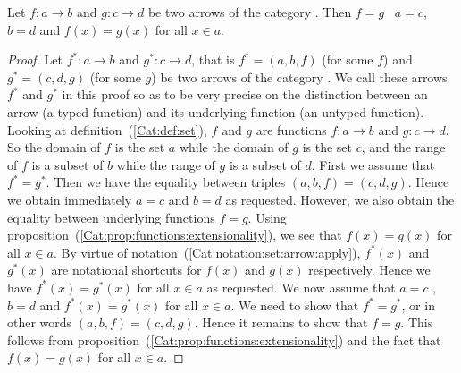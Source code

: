\begin{prop}\label{Cat:prop:set:arrow:equal}
    Let $f:a\to b$ and $g:c\to d$ be two arrows of the category \Set. Then 
    $f=g$ \ifand\ $a=c$, $b=d$ and $f(x)=g(x)$ for all $x\in a$.
\end{prop}
\begin{proof}
    Let $f^{*}:a \to b$ and $g^{*}:c \to d$, that is $f^{*}=(a,b,f)$ 
    (for some $f$) and $g^{*}=(c,d,g)$ (for some $g$) be two arrows
    of the category \Set. We call these arrows $f^{*}$ and $g^{*}$ in
    this proof so as to be very precise on the distinction between
    an arrow (a typed function) and its underlying function (an
    untyped function). Looking at definition~(\ref{Cat:def:set}), 
    $f$ and $g$ are functions $f:a\to b$ and $g:c\to d$. So the 
    domain of $f$ is the set $a$ while the domain of $g$ 
    is the set $c$, and the range of $f$ is a subset of $b$ while the range of 
    $g$ is a subset of $d$. First we assume that $f^{*}=g^{*}$. Then we have 
    the equality between triples $(a,b,f)=(c,d,g)$. Hence we obtain immediately
    $a=c$ and $b=d$ as requested. However, we also obtain the equality
    between underlying functions $f=g$. Using 
    proposition~(\ref{Cat:prop:functions:extensionality}), we see
    that $f(x)=g(x)$ for all $x\in a$. By virtue of
    notation~(\ref{Cat:notation:set:arrow:apply}), $f^{*}(x)$ and 
    $g^{*}(x)$ are notational shortcuts for $f(x)$ and $g(x)$ 
    respectively. Hence we have $f^{*}(x)=g^{*}(x)$ for all $x\in a$
    as requested. We now assume that $a=c$ , $b=d$ and $f^{*}(x)=g^{*}(x)$
    for all $x\in a$. We need to show that $f^{*}=g^{*}$, or in other
    words $(a,b,f)=(c,d,g)$. Hence it remains to show that $f=g$. This
    follows from proposition~(\ref{Cat:prop:functions:extensionality}) and
    the fact that $f(x)=g(x)$ for all $x\in a$.
\end{proof}

